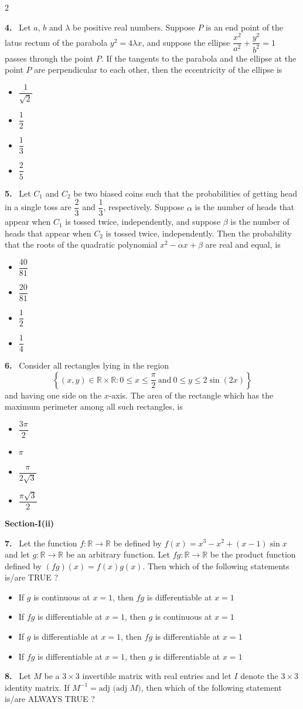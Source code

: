 \documentclass[10pt]{extarticle}
\newcommand{\sect}[1]{\par\smallskip\noindent\textbf{#1}\par}
\newcommand{\qn}[1]{\par\smallskip\noindent\textbf{#1.}~}
\newenvironment{qoptions}{\begin{itemize}[leftmargin=1.8em,itemsep=1pt,topsep=2pt,label={}]}{\end{itemize}}
\newcommand{\opt}[2]{\item[(#1)] #2}
\begin{document}
\begin{multicols}{2}
\qn{4} Let $a$, $b$ and $\lambda$ be positive real numbers. Suppose $P$ is an end point of the latus rectum of the parabola $y^2=4\lambda x$, and suppose the ellipse $\dfrac{x^2}{a^2}+\dfrac{y^2}{b^2}=1$ passes through the point $P$. If the tangents to the parabola and the ellipse at the point $P$ are perpendicular to each other, then the eccentricity of the ellipse is
\begin{qoptions}
\opt{A}{$\dfrac1{\sqrt2}$}
\opt{B}{$\dfrac12$}
\opt{C}{$\dfrac13$}
\opt{D}{$\dfrac25$}
\end{qoptions}
\qn{5} Let $C_1$ and $C_2$ be two biased coins such that the probabilities of getting head in a single toss are $\dfrac23$ and $\dfrac13$, respectively. Suppose $\alpha$ is the number of heads that appear when $C_1$ is tossed twice, independently, and suppose $\beta$ is the number of heads that appear when $C_2$ is tossed twice, independently. Then the probability that the roots of the quadratic polynomial $x^2-\alpha x+\beta$ are real and equal, is
\begin{qoptions}
\opt{A}{$\dfrac{40}{81}$}
\opt{B}{$\dfrac{20}{81}$}
\opt{C}{$\dfrac12$}
\opt{D}{$\dfrac14$}
\end{qoptions}
\qn{6} Consider all rectangles lying in the region
\[\left\{(x,y)\in\mathbb R\times\mathbb R:0\le x\le\frac\pi2\ \text{and}\ 0\le y\le2\sin(2x)\right\}\]
and having one side on the $x$-axis. The area of the rectangle which has the maximum perimeter among all such rectangles, is
\begin{qoptions}
\opt{A}{$\dfrac{3\pi}2$}
\opt{B}{$\pi$}
\opt{C}{$\dfrac{\pi}{2\sqrt3}$}
\opt{D}{$\dfrac{\pi\sqrt3}2$}
\end{qoptions}
\sect{Section-I(ii)}
\qn{7} Let the function $f:\mathbb R\to\mathbb R$ be defined by $f(x)=x^3-x^2+(x-1)\sin x$ and let $g:\mathbb R\to\mathbb R$ be an arbitrary function. Let $fg:\mathbb R\to\mathbb R$ be the product function defined by $(fg)(x)=f(x)g(x)$. Then which of the following statements is/are TRUE ?
\begin{qoptions}
\opt{A}{If $g$ is continuous at $x=1$, then $fg$ is differentiable at $x=1$}
\opt{B}{If $fg$ is differentiable at $x=1$, then $g$ is continuous at $x=1$}
\opt{C}{If $g$ is differentiable at $x=1$, then $fg$ is differentiable at $x=1$}
\opt{D}{If $fg$ is differentiable at $x=1$, then $g$ is differentiable at $x=1$}
\end{qoptions}
\qn{8} Let $M$ be a $3\times3$ invertible matrix with real entries and let $I$ denote the $3\times3$ identity matrix. If $M^{-1}=\text{adj (adj }M)$, then which of the following statement is/are ALWAYS TRUE ?

\end{multicols}
\end{document}
